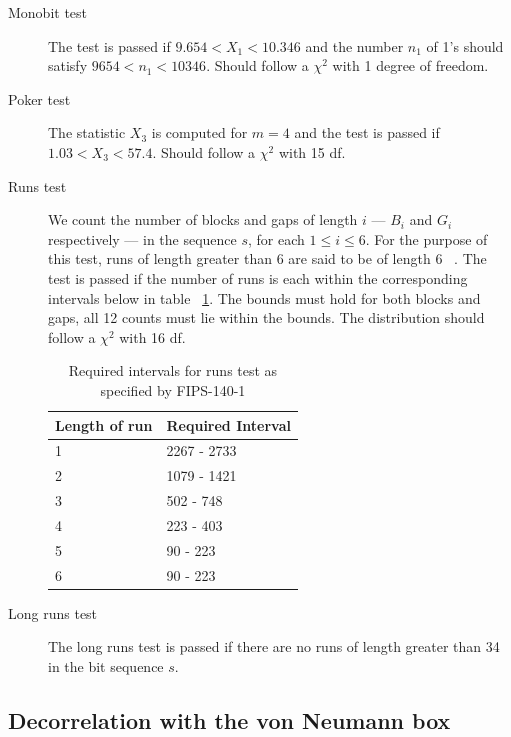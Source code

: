 \documentclass[a4paper]{article}           %
\begin{document}
\begin{description}
\item[Monobit test] The test is passed if $9.654 < X_1 < 10.346$ and the number $n_1$ of 1's should satisfy $9654 < n_1 < 10346$. Should follow a $\chi^2$ with 1 degree of freedom. 
\item[Poker test] The statistic $X_3$ is computed for $m=4$ and the test is passed if $1.03 < X_3 < 57.4$. Should follow a $\chi^2$ with 15 df. 
\item [Runs test] We count the number of blocks and gaps of length $i$ --- $B_i$ and $G_i$ respectively --- in the sequence $s$, for each $1 \leq i \leq 6$. For the purpose of this test, runs of length greater than 6 are said to be of length 6 ~\cite{fips140}. The test is passed if the number of runs is each within the corresponding intervals below in table ~\ref{tab:fipsbounds}. The bounds must hold for both blocks and gaps, all 12 counts must lie within the bounds. The distribution should follow a $\chi^2$ with 16 df. 

  \begin{table}[H]
    \begin{center}
      \begin{tabular}{| l | l |}
        \hline
        Length of run & Required Interval \\
        \hline
        \hline
        1 & 2267 - 2733 \\
        2 & 1079 - 1421 \\
        3 & 502 - 748 \\
        4 & 223 - 403 \\
        5 & 90 - 223 \\
        6 & 90 - 223 \\
        \hline
      \end{tabular}
    \end{center}
    \caption{Required intervals for runs test as specified by FIPS-140-1}
    \label{tab:fipsbounds}
  \end{table}

\item[Long runs test] The long runs test is passed if there are no runs of length greater than 34 in the bit sequence $s$. 
\end{description}

\subsection{Decorrelation with the von Neumann box}
\end{document}
